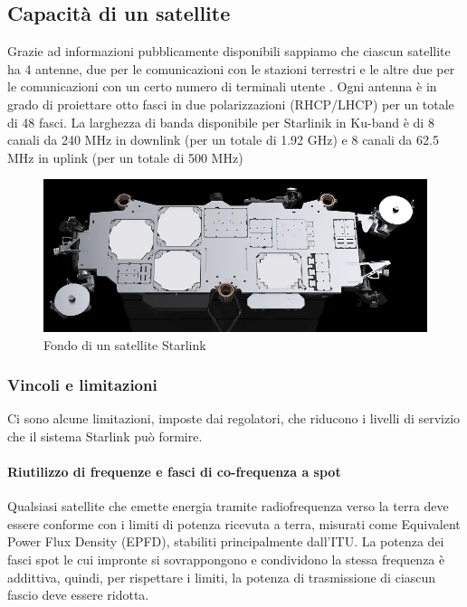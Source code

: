 \subsection{Capacità di un satellite}

Grazie ad informazioni pubblicamente disponibili sappiamo che ciascun satellite ha 4 antenne, due per le comunicazioni con le stazioni terrestri e le altre due per le comunicazioni con un certo numero di terminali utente \cite{branch_education_how_2022}.
Ogni antenna è in grado di proiettare otto fasci in due polarizzazioni (RHCP/LHCP) per un totale di 48 fasci.
La larghezza di banda disponibile per Starlinik in \ac{Ku}-band è di 8 canali da 240 MHz in downlink (per un totale di 1.92 GHz) e 8 canali da 62.5 MHz in uplink (per un totale di 500 MHz)

\begin{figure}[htbp]
  \centering
  \includegraphics[width=0.9\linewidth]{./res/img/starlink_satellite_back.png}
  \caption{Fondo di un satellite Starlink \cite{mike_puchol_modeling_2022}}
  \label{fig:starlink-satellite}
\end{figure}

\subsubsection{Vincoli e limitazioni}
Ci sono alcune limitazioni, imposte dai regolatori, che riducono i livelli di servizio che il sistema Starlink può formire.

\paragraph{Riutilizzo di frequenze e fasci di co-frequenza a spot}
Qualsiasi satellite che emette energia tramite radiofrequenza verso la terra deve essere conforme con i limiti di potenza ricevuta a terra, misurati come Equivalent Power Flux Density (EPFD), stabiliti principalmente dall'\ac{ITU}.
La potenza dei fasci spot le cui impronte si sovrappongono e condividono la stessa frequenza è addittiva, quindi, per rispettare i limiti, la potenza di trasmissione di ciascun fascio deve essere ridotta.

